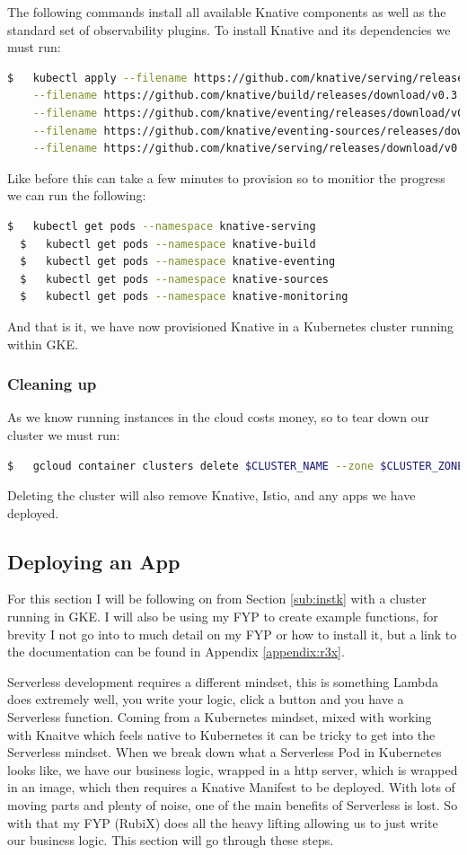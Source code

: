 The following commands install all available Knative components as well as the
standard set of observability plugins. To install Knative and its dependencies we must run:
\begin{lstlisting}[language=bash]
  $   kubectl apply --filename https://github.com/knative/serving/releases/download/v0.3.0/serving.yaml \
    --filename https://github.com/knative/build/releases/download/v0.3.0/release.yaml \
    --filename https://github.com/knative/eventing/releases/download/v0.3.0/release.yaml \
    --filename https://github.com/knative/eventing-sources/releases/download/v0.3.0/release.yaml \
    --filename https://github.com/knative/serving/releases/download/v0.3.0/monitoring.yaml
\end{lstlisting}
Like before this can take a few minutes to provision so to monitior the progress we can run the following:
\begin{lstlisting}[language=bash]
  $   kubectl get pods --namespace knative-serving
  $   kubectl get pods --namespace knative-build
  $   kubectl get pods --namespace knative-eventing
  $   kubectl get pods --namespace knative-sources
  $   kubectl get pods --namespace knative-monitoring
\end{lstlisting}
And that is it, we have now provisioned Knative in a Kubernetes cluster running within GKE.

\subsubsection{Cleaning up}
As we know running instances in the cloud costs money, so to tear down our cluster we must run:
\begin{lstlisting}[language=bash]
  $   gcloud container clusters delete $CLUSTER_NAME --zone $CLUSTER_ZONE
\end{lstlisting}
Deleting the cluster will also remove Knative, Istio, and any apps we have deployed.

\subsection{Deploying an App}
For this section I will be following on from Section \ref{sub:instk} with a cluster running in GKE. I will also be using my FYP to create example functions, for brevity I not go into to much detail on my FYP or how to install it, but a link to the documentation can be found in Appendix \ref{appendix:r3x}.

Serverless development requires a different mindset, this is something Lambda does extremely well, you write your logic, click a button and you have a Serverless function. Coming from a Kubernetes mindset, mixed with working with Knaitve which feels native to Kubernetes it can be tricky to get into the Serverless mindset. When we break down what a Serverless Pod in Kubernetes looks like, we have our business logic, wrapped in a http server, which is wrapped in an image, which then requires a Knative Manifest to be deployed. With lots of moving parts and plenty of noise, one of the main benefits of Serverless is lost. So with that my FYP (RubiX) does all the heavy lifting allowing us to just write our business logic. This section will go through these steps.

